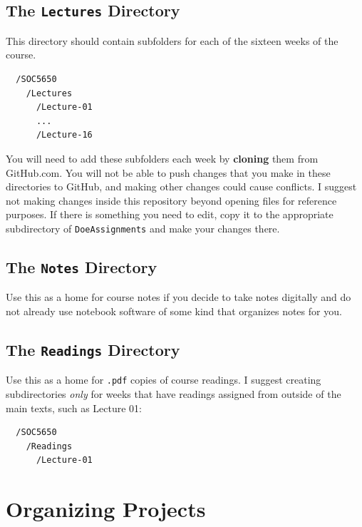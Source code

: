 \documentclass[]{book}
\theoremstyle{definition}
\theoremstyle{definition}
\theoremstyle{definition}
\theoremstyle{remark}
\begin{document}
\subsection{\texorpdfstring{The \texttt{Lectures}
Directory}{The Lectures Directory}}\label{the-lectures-directory}

This directory should contain subfolders for each of the sixteen weeks
of the course.

\begin{verbatim}
  /SOC5650
    /Lectures
      /Lecture-01
      ...
      /Lecture-16
\end{verbatim}

You will need to add these subfolders each week by \textbf{cloning} them
from GitHub.com. You will not be able to push changes that you make in
these directories to GitHub, and making other changes could cause
conflicts. I suggest not making changes inside this repository beyond
opening files for reference purposes. If there is something you need to
edit, copy it to the appropriate subdirectory of \texttt{DoeAssignments}
and make your changes there.

\subsection{\texorpdfstring{The \texttt{Notes}
Directory}{The Notes Directory}}\label{the-notes-directory}

Use this as a home for course notes if you decide to take notes
digitally and do not already use notebook software of some kind that
organizes notes for you.

\subsection{\texorpdfstring{The \texttt{Readings}
Directory}{The Readings Directory}}\label{the-readings-directory}

Use this as a home for \texttt{.pdf} copies of course readings. I
suggest creating subdirectories \emph{only} for weeks that have readings
assigned from outside of the main texts, such as Lecture 01:

\begin{verbatim}
  /SOC5650
    /Readings
      /Lecture-01
\end{verbatim}

\hypertarget{organizing-projects}{\section{Organizing
Projects}\label{organizing-projects}}
\end{document}
